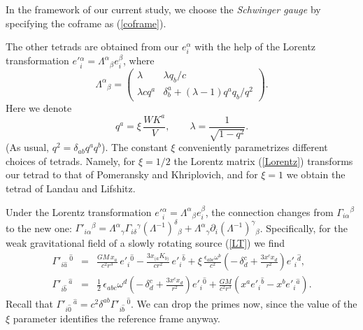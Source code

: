 \documentclass[preprint,showpacs,preprintnumbers,amsmath,amssymb]{revtex4}
\begin{document}
In the framework of our current study, we choose the {\it Schwinger gauge}
by specifying the coframe as (\ref{coframe}).

The other tetrads are obtained from our $e^\alpha_i$ with
the help of the Lorentz transformation $e'{}^\alpha_i = \Lambda^\alpha{}_\beta
e^\beta_i$, where
\begin{equation}\label{Lorentz}
\Lambda^\alpha{}_\beta = \left(\begin{array}{c|c}\lambda & \lambda q_b/c \\
\hline \lambda cq^a & \delta^a_b + (\lambda - 1)q^aq_b/q^2\end{array}\right).
\end{equation}
Here we denote
\begin{equation}\label{qxi}
q^a = \xi\,{\frac {WK^a}{V}},\qquad \lambda = {\frac {1}{\sqrt{1 - q^2}}}.
\end{equation}
(As usual, $q^2 = \delta_{ab}q^aq^b$). The constant $\xi$ conveniently
parametrizes different choices of tetrads. Namely, for $\xi = 1/2$ the
Lorentz matrix (\ref{Lorentz}) transforms our tetrad to that of Pomeransky
and Khriplovich, and for $\xi = 1$ we obtain the tetrad of Landau and
Lifshitz.

Under the Lorentz transformation $e'{}^\alpha_i = \Lambda^\alpha{}_\beta
e^\beta_i$, the connection changes from $\Gamma_{i\alpha}{}^\beta$ to the
new one: $\Gamma{}'{}_{i\alpha}{}^\beta = \Lambda^\alpha{}_\gamma
\Gamma_{i\delta}{}^\gamma(\Lambda^{-1})^\delta{}_\beta + \Lambda^\alpha
{}_\gamma\partial_i(\Lambda^{-1})^\gamma{}_\beta$. Specifically, for the
weak gravitational field of a slowly rotating source (\ref{LT}) we find
\begin{eqnarray}
\Gamma{}'_{i\widehat{a}}{\,}^{\widehat{0}} &=& {\frac {GM\,x_a}{c^2r^3}}
\,e'_i{}^{\widehat{0}} - {\frac {3x_{(a}K_{b)}}{cr^2}}\,e'_i{}^{\widehat{b}}
+ \xi\,{\frac {\epsilon_{abc}\omega^b}{c^2}}\left( -\,\delta^c_d + {\frac
{3x^cx_d}{r^2}}\right)e'_i{}^{\widehat{d}},\label{conn1}\\
\Gamma{}'_{i\widehat{b}}{\,}^{\widehat{a}} &=& {\frac 12}\,\epsilon_{abc}
\omega^d\left( -\,\delta^c_d + {\frac {3x^cx_d}{r^2}}\right)e'_i{}^{\widehat{0}}
+ {\frac {GM}{c^2r^3}}\left(x^a e'_i{}^{\widehat{b}}
- x^b e'_i{}^{\widehat{a}}\right).\label{conn2}
\end{eqnarray}
Recall that $\Gamma{}'_{i\widehat{0}}{\,}^{\widehat{a}} = c^2\delta^{ab}
\Gamma{}'_{i\widehat{b}}{\,}^{\widehat{0}}$. We can drop the primes now,
since the value of the $\xi$ parameter identifies the reference frame
anyway.
\end{document}
